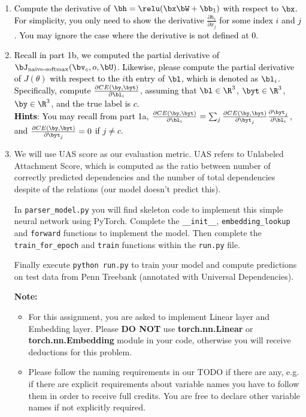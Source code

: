 \begin{parts}
    \begin{enumerate}[label=\roman*.]
    
        \item \textcolor{black}{Compute the derivative of $\bh = \relu(\bx \bW + \bb_1)$ with respect to $\bx$. For simplicity, you only need to show the derivative $\frac{\partial h_i}{\partial x_j}$ for some index $i$ and $j$. You may ignore the case where the derivative is not defined at 0.}
        \item \textcolor{black}{Recall in part 1b, we computed the partial derivative of $\bJ_{\text{naive-softmax}}(\bv_c, o, \bU)$. Likewise, please compute the partial derivative of $J(\theta)$ with respect to the $i$th entry of $\bl$, which is denoted as $\bl_i$. Specifically, compute $\frac{\partial CE(\by, \byt)}{\partial \bl_i}$, assuming that $\bl \in \R^3$, $\byt \in \R^3$, $\by \in \R^3$, and the true label is $c$. \\
        \textbf{Hints}: You may recall from part 1a, $\frac{\partial CE(\by, \byt)}{\partial \bl_i} = \sum_j \frac{\partial CE(\by, \byt)}{\partial \byt_j}\frac{\partial \byt_j}{\partial \bl_i}$, and $\frac{\partial CE(\by, \byt)}{\partial \byt_j}=0$ if $j \neq c$. 
        }
        \item We will use UAS score as our evaluation metric. UAS refers to Unlabeled Attachment Score, which is computed as the ratio between number of correctly predicted dependencies and the number of total dependencies despite of the relations (our model doesn't predict this).\newline
    
   In \texttt{parser\_model.py} you will find skeleton code to implement this simple neural network using PyTorch. Complete the \texttt{\_\_init\_\_}, \texttt{embedding\_lookup} and \texttt{forward} functions to implement the model. Then complete the \texttt{train\_for\_epoch} and \texttt{train} functions within the \texttt{run.py} file.
   
    Finally execute \texttt{python run.py} to train your model and compute predictions
    on test data from Penn Treebank (annotated with Universal Dependencies). 
    
    \textbf{Note:}
    \begin{itemize}
        \item For this assignment, you are asked to implement Linear layer and Embedding layer. Please \textbf{DO NOT} use \textbf{torch.nn.Linear} or  \textbf{torch.nn.Embedding} module in your code, otherwise you will receive deductions for this problem. 
        \item Please follow the naming requirements in our TODO if there are any, e.g. if there are explicit requirements about variable names you have to follow them in order to receive full credits. You are free to declare other variable names if not explicitly required. 
    \end{itemize}
    

\end{enumerate}
\end{parts}
